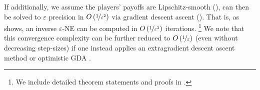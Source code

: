 


If additionally, we assume the players' payoffs are Lipschitz-smooth (),  can then be solved to $\varepsilon$ precision in $O\left( \nicefrac{1}{\varepsilon^2} \right)$ via gradient descent ascent (). 
That is, as  shows, an inverse $\varepsilon$-NE can be computed in $O\left( \nicefrac{1}{\varepsilon^2} \right)$ iterations.%
\footnote{We include detailed theorem statements and proofs in .}
We note that this convergence complexity can be further reduced to $O\left( \nicefrac{1}{\varepsilon} \right)$ (even without decreasing step-sizes) if one instead applies an extragradient descent ascent method \citep{golowich2020eglast} or optimistic GDA \citep{gorbunov2022last}.

